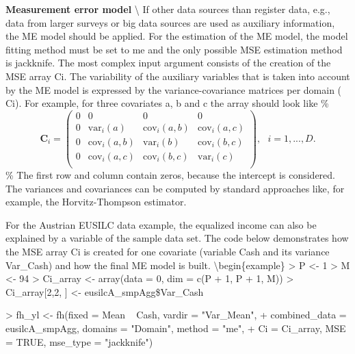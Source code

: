 \begin{example}
\textbf{Measurement error model} \textbackslash{}
If other data sources than register data, e.g., data from larger surveys or big data sources are used as auxiliary information, the ME model should be applied. For the estimation of the ME model, the model fitting method must be set to \texorpdfstring%
{{\normalfont\ttfamily\hyphenchar{} me}}%
{me} and the only possible MSE estimation method is \texorpdfstring%
{{\normalfont\ttfamily\hyphenchar{} jackknife}}%
{jackknife}. The most complex input argument consists of the creation of the MSE array \texorpdfstring%
{{\normalfont\ttfamily\hyphenchar{} Ci}}%
{Ci}. The variability of the auxiliary variables that is taken into account by the ME model is expressed by the variance-covariance matrices per domain (\texorpdfstring%
{{\normalfont\ttfamily\hyphenchar{} Ci}}%
{Ci}). For example, for three covariates a, b and c the array should look like
\%
\begin{equation*}
\boldsymbol{C}_i = \left( \begin{array}{rrrr}
0 & 0 & 0 & 0 \\
0 & \text{var}_i(a) & \text{cov}_i(a,b) & \text{cov}_i(a,c) \\
0 & \text{cov}_i(a,b) & \text{var}_i(b) & \text{cov}_i(b,c) \\
0 & \text{cov}_i(a,c) & \text{cov}_i(b,c) & \text{var}_i(c) \\
\end{array}\right),
\text{   } i = 1,...,D.
\end{equation*}
\%
The first row and column contain zeros, because the intercept is considered. The variances and covariances can be computed by standard approaches like, for example, the Horvitz-Thompson estimator.

For the Austrian EUSILC data example, the equalized income can also be explained by a variable of the sample data set. The code below demonstrates how the MSE array \texorpdfstring%
{{\normalfont\ttfamily\hyphenchar{} Ci}}%
{Ci} is created for one covariate (variable \texorpdfstring%
{{\normalfont\ttfamily\hyphenchar{} Cash}}%
{Cash} and its variance \texorpdfstring%
{{\normalfont\ttfamily\hyphenchar{} Var\_Cash}}%
{Var\_Cash}) and how the final ME model is built.
\textbackslash begin\{example\}
\textgreater{} P \textless- 1
\textgreater{} M \textless- 94
\textgreater{} Ci\_array \textless- array(data = 0, dim = c(P + 1, P + 1, M))
\textgreater{} Ci\_array{[}2,2, {]} \textless- eusilcA\_smpAgg\$Var\_Cash

\textgreater{} fh\_yl \textless- fh(fixed = Mean ~ Cash, vardir = "Var\_Mean", +
combined\_data = eusilcA\_smpAgg, domains = "Domain", method = "me", +
Ci = Ci\_array, MSE = TRUE, mse\_type = "jackknife")
\end{example}

